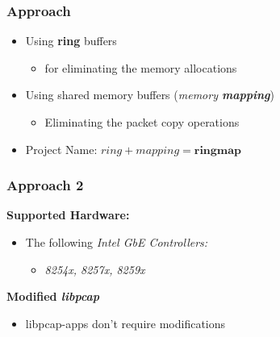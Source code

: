 \begin{frame}
\frametitle{Approach}
\begin{itemize}
	\item<1-> Using \textbf{ring} buffers
		\begin{itemize}
			\item<1-> for eliminating the memory allocations
		\end{itemize}

	\item<2-> Using shared memory buffers (\emph{memory \textbf{mapping}})
		\begin{itemize}
			\item<2-> Eliminating the packet copy operations				
		\end{itemize}
	\item<3->[$\Rightarrow$] Project Name: $ring + mapping = \textbf{ringmap}$
\end{itemize}
\end{frame}


\begin{frame}
\frametitle{Approach 2}
\textbf{Supported Hardware:}
\begin{itemize}
	\item The following \emph{Intel GbE Controllers:}
		\begin{itemize}
			\item \small{\emph{8254x, 8257x, 8259x}}\newline
		\end{itemize}
\end{itemize}

\textbf{Modified \emph{libpcap}}
	\begin{itemize}
		\item libpcap-apps don't require modifications\newline
	\end{itemize}
\end{frame}
